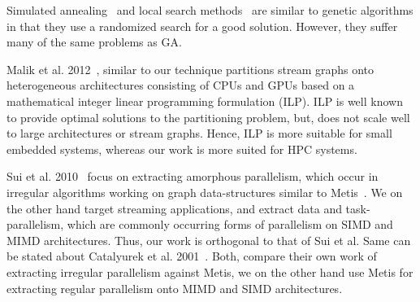 Simulated annealing~\cite{shroff1996genetic,664363} and local search
methods~\cite{622584,537394} are similar to genetic algorithms in that
they use a randomized search for a good solution. However, they suffer
many of the same problems as GA.

Malik et al. 2012~\cite{Malik2012}, similar to our technique partitions stream
graphs onto heterogeneous architectures consisting of CPUs and GPUs based on a
mathematical integer linear programming formulation (ILP). ILP is well known to
provide optimal solutions to the partitioning problem, but, does not scale well
to large architectures or stream graphs. Hence, ILP is more suitable for small
embedded systems, whereas our work is more suited for HPC systems.

Sui et al. 2010~\cite{Sui:2010:PGP:1964536.1964553} focus on extracting amorphous
parallelism, which occur in irregular algorithms working on graph
data-structures similar to Metis~\cite{gkar95}. We on the other hand target
streaming applications, and extract data and task-parallelism, which are
commonly occurring forms of parallelism on SIMD and MIMD architectures. Thus,
our work is orthogonal to that of Sui et al. Same can be stated about Catalyurek
et al. 2001~\cite{Catalyurek:2001:HAC:582034.582062}. Both, compare their own
work of extracting irregular parallelism against Metis, we on the other hand
use Metis for extracting regular parallelism onto MIMD and SIMD architectures.
\\
